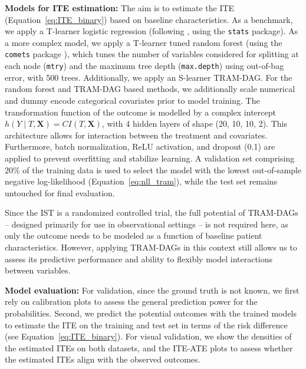 \textbf{Models for ITE estimation: } The aim is to estimate the ITE (Equation~\ref{eq:ITE_binary}) based on baseline characteristics. As a benchmark, we apply a T-learner logistic regression (following \citet{chen2025}, using the \texttt{stats} package). As a more complex model, we apply a T-learner tuned random forest (using the \texttt{comets} package \citep{comets}), which tunes the number of variables considered for splitting at each node (\texttt{mtry}) and the maximum tree depth (\texttt{max.depth}) using out-of-bag error, with 500 trees. Additionally, we apply an S-learner TRAM-DAG. For the random forest and TRAM-DAG based methods, we additionally scale numerical and dummy encode categorical covariates prior to model training. The transformation function of the outcome is modelled by a complex intercept $h(Y \mid T, \mathbf{X}) = CI(T, \mathbf{X})$, with 4 hidden layers of shape (20, 10, 10, 2). This architecture allows for interaction between the treatment and covariates. Furthermore, batch normalization, ReLU activation, and dropout (0.1) are applied to prevent overfitting and stabilize learning. A validation set comprising 20\% of the training data is used to select the model with the lowest out-of-sample negative log-likelihood (Equation~\ref{eq:nll_tram}), while the test set remains untouched for final evaluation. 

Since the IST is a randomized controlled trial, the full potential of TRAM-DAGs -- designed primarily for use in observational settings -- is not required here, as only the outcome needs to be modeled as a function of baseline patient characteristics. However, applying TRAM-DAGs in this context still allows us to assess its predictive performance and ability to flexibly model interactions between variables.



\medskip

\textbf{Model evaluation: } For validation, since the ground truth is not known, we first rely on calibration plots to assess the general prediction power for the probabilities. Second, we predict the potential outcomes with the trained models to estimate the ITE on the training and test set in terms of the risk difference (see Equation~\ref{eq:ITE_binary}). For visual validation, we show the densities of the estimated ITEs on both datasets, and the ITE-ATE plots to assess whether the estimated ITEs align with the observed outcomes.











